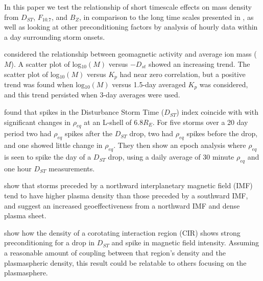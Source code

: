 \documentclass[10pt,twocolumn]{article}
\begin{document}
In this paper we test the relationship of short timescale effects on mass density from $D_{ST}$, $F_{10.7}$, and $B_Z$, in comparison to the long time scales presented in \cite{Takahashi2010,Takahashi2006}, as well as looking at other preconditioning factors by analysis of hourly data within a day surrounding storm onsets.  


\cite{Takahashi2006} considered the relationship between geomagnetic activity and average ion mass ($M$).  A scatter plot of log$_{10}(M)$ versus $-D_{st}$ showed an increasing trend.  The scatter plot of log$_{10}(M)$ versus $K_p$ had near zero correlation, but a positive trend was found when log$_{10}(M)$ versus 1.5-day averaged $K_p$ was considered, and this trend persisted when 3-day averages were used. 


\cite{Takahashi2010} found that spikes in the Disturbance Storm Time ($D_{ST}$) index coincide with with significant changes in $\rho_{eq}$ at an L-shell of 6.8$R_E$. For five storms over a 20 day period two had $\rho_{eq}$ spikes after the $D_{ST}$ drop, two had $\rho_{eq}$ spikes before the drop, and one showed little change in $\rho_{eq}$. They then show an epoch analysis where $\rho_{eq}$ is seen to spike the day of a $D_{ST}$ drop, using a daily average of 30 minute $\rho_{eq}$ and one hour $D_{ST}$ measurements. 

\cite{Lavraud2006} show that storms preceded by a northward interplanetary magnetic field (IMF) tend to have higher plasma density than those preceded by a southward IMF, and suggest an increased geoeffectiveness from a northward IMF and dense plasma sheet.

\cite{Tsurutani1997} show how the density of a corotating interaction region (CIR) shows strong preconditioning for a drop in $D_{ST}$ and spike in magnetic field intensity. Assuming a reasonable amount of coupling between that region's density and the plasmaspheric density, this result could be relatable to others focusing on the plasmasphere. 
\end{document}
